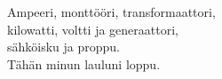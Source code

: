 
Ampeeri, monttööri, transformaattori, \\ kilowatti, voltti ja generaattori, \\ sähköisku ja proppu. \\ Tähän minun lauluni loppu.